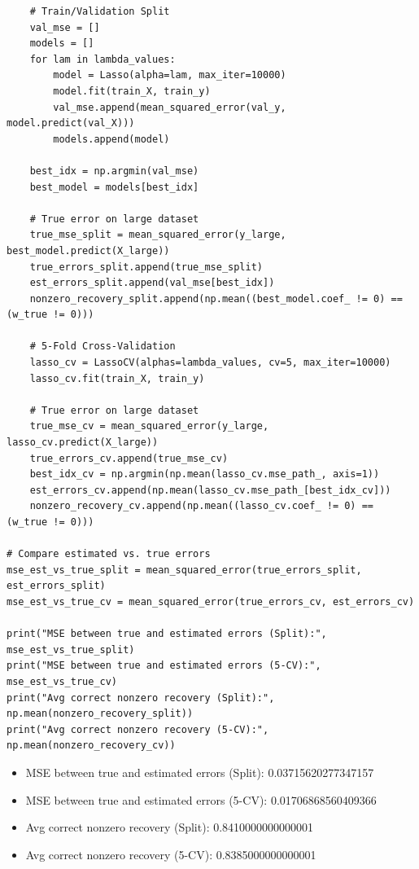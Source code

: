 \documentclass{article}
\begin{document}
\begin{probset}
\begin{prob}
\begin{subprobset}
\begin{subprob}
\begin{verbatim}
    # Train/Validation Split
    val_mse = []
    models = []
    for lam in lambda_values:
        model = Lasso(alpha=lam, max_iter=10000)
        model.fit(train_X, train_y)
        val_mse.append(mean_squared_error(val_y, model.predict(val_X)))
        models.append(model)
    
    best_idx = np.argmin(val_mse)
    best_model = models[best_idx]
    
    # True error on large dataset
    true_mse_split = mean_squared_error(y_large, best_model.predict(X_large))
    true_errors_split.append(true_mse_split)
    est_errors_split.append(val_mse[best_idx])
    nonzero_recovery_split.append(np.mean((best_model.coef_ != 0) == (w_true != 0)))
    
    # 5-Fold Cross-Validation
    lasso_cv = LassoCV(alphas=lambda_values, cv=5, max_iter=10000)
    lasso_cv.fit(train_X, train_y)
    
    # True error on large dataset
    true_mse_cv = mean_squared_error(y_large, lasso_cv.predict(X_large))
    true_errors_cv.append(true_mse_cv)
    best_idx_cv = np.argmin(np.mean(lasso_cv.mse_path_, axis=1))
    est_errors_cv.append(np.mean(lasso_cv.mse_path_[best_idx_cv]))
    nonzero_recovery_cv.append(np.mean((lasso_cv.coef_ != 0) == (w_true != 0)))

# Compare estimated vs. true errors
mse_est_vs_true_split = mean_squared_error(true_errors_split, est_errors_split)
mse_est_vs_true_cv = mean_squared_error(true_errors_cv, est_errors_cv)

print("MSE between true and estimated errors (Split):", mse_est_vs_true_split)
print("MSE between true and estimated errors (5-CV):", mse_est_vs_true_cv)
print("Avg correct nonzero recovery (Split):", np.mean(nonzero_recovery_split))
print("Avg correct nonzero recovery (5-CV):", np.mean(nonzero_recovery_cv))
            \end{verbatim}

            \begin{soln}
                \begin{itemize}
                    \item MSE between true and estimated errors (Split): 0.03715620277347157
                    \item MSE between true and estimated errors (5-CV): 0.01706868560409366
                    \item Avg correct nonzero recovery (Split): 0.8410000000000001
                    \item Avg correct nonzero recovery (5-CV): 0.8385000000000001
                \end{itemize}


\end{soln}
\end{subprob}
\end{subprobset}
\end{prob}
\end{probset}
\end{document}
